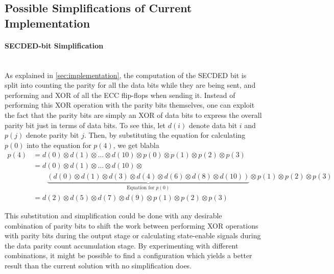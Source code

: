 \subsection{Possible Simplifications of Current Implementation}

\paragraph{SECDED-bit Simplification} \hfill \\
As explained in \autoref{sec:implementation}, the computation of the
SECDED bit is split into counting the parity for all the data bits
while they are being sent, and performing and XOR of all the ECC
flip-flops when sending it. Instead of performing this XOR operation
with the parity bits themselves, one can exploit the fact that the
parity bits are simply an XOR of data bits to express the overall
parity bit just in terms of data bits. To see this, let $d(i)$ denote
data bit $i$ and $p(j)$ denote parity bit $j$.  Then, by substituting
the equation for calculating $p(0)$ into the equation for $p(4)$, we
get blabla
\begin{align*}
  p(4) &= d(0) \otimes d(1) \otimes \ldots \otimes d(10) \otimes p(0) \otimes p(1) \otimes p(2) \otimes p(3) \\
  &= d(0) \otimes d(1) \otimes \ldots \otimes d(10) \otimes \\
  & \qquad \underbrace{(d(0) \otimes d(1) \otimes d(3) \otimes d(4) \otimes d(6)
  \otimes d(8) \otimes d(10))}_{\text{Equation for }p(0)}  \otimes p(1) \otimes p(2) \otimes p(3) \\
  &= d(2) \otimes d(5) \otimes d(7) \otimes d(9) \otimes p(1) \otimes p(2) \otimes p(3)
\end{align*}

This substitution and simplification could be done with any desirable
combination of parity bits to shift the work between performing XOR
operations with parity bits during the output stage or calculating
state-enable signals during the data parity count accumulation
stage. By experimenting with different combinations, it might be
possible to find a configuration which yields a better
result than the current solution with no simplification does. 

